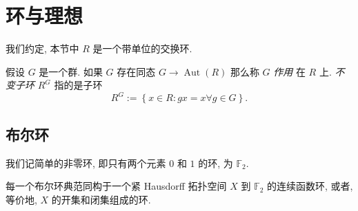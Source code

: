 \section{环与理想}

我们约定, 本节中 \( R \) 是一个带单位的交换环.

假设 \( G \) 是一个群. 如果 \( G \) 存在同态 \( G \to \operatorname{Aut}(R) \)
那么称 \( G \) \emph{作用} 在 \( R \) 上. \emph{不变子环} \( R^G \)
指的是子环
\[
  R^G := \left\lbrace x \in R: gx = x \forall g \in G \right\rbrace.
\]

\subsection{布尔环}

我们记简单的非零环, 即只有两个元素 \( 0 \) 和 \( 1 \) 的环, 为 \( \mathbb{F}_2
\).

\begin{theorem}[Stone]
  每一个布尔环典范同构于一个紧 Hausdorff 拓扑空间 \( X \) 到 \( \mathbb{F}_2 \)
  的连续函数环, 或者, 等价地, \( X \) 的开集和闭集组成的环.
\end{theorem}

